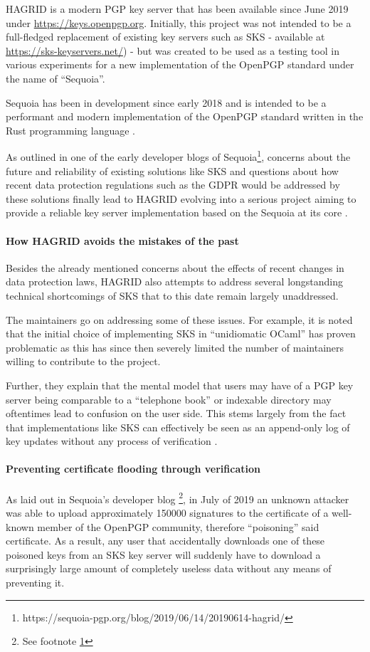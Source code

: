

HAGRID is a modern PGP key server that has been available since June 2019 under \url{https://keys.openpgp.org}. 
Initially, this project was not intended to be a full-fledged replacement of existing key servers such as SKS - available at \url{https://sks-keyservers.net/}) - but was created to be used as a testing tool in various experiments for a new implementation of the OpenPGP standard under the name of ``Sequoia''.

Sequoia has been in development since early 2018 and is intended to be a performant and modern implementation of the OpenPGP standard written in the Rust programming language \cite{sequoia_blog}.

As outlined in one of the early developer blogs of Sequoia\footnote[1]{\label{footnote}https://sequoia-pgp.org/blog/2019/06/14/20190614-hagrid/}, concerns about the future and reliability of existing solutions like SKS and questions about how recent data protection regulations such as the GDPR would be addressed by these solutions finally lead to HAGRID evolving into a serious project aiming to provide a reliable key server implementation based on the Sequoia at its core \cite{sequoia_blog}.


\paragraph{How HAGRID avoids the mistakes of the past}
\label{sec:hagrid_solves}
Besides the already mentioned concerns about the effects of recent changes in data protection laws, HAGRID also attempts to address several longstanding technical shortcomings of SKS that to this date remain largely unaddressed.

The maintainers go on addressing some of these issues. For example, it is noted that the initial choice of implementing SKS in ``unidiomatic OCaml'' has proven problematic as this has since then severely limited the number of maintainers willing to contribute to the project.

Further, they explain that the mental model that users may have of a PGP key server being comparable to a ``telephone book'' or indexable directory may oftentimes lead to confusion on the user side. This stems largely from the fact that implementations like SKS can effectively be seen as an append-only log of key updates without any process of verification \cite{sequoia_blog}.  

\paragraph{Preventing certificate flooding through verification}
As laid out in Sequoia's developer blog \footnote{See footnote \ref{footnote}}, in July of 2019 an unknown attacker was able to upload approximately 150000 signatures to the certificate of a well-known member of the OpenPGP community, therefore ``poisoning'' said certificate. As a result, any user that accidentally downloads one of these poisoned keys from an SKS key server will suddenly have to download a surprisingly large amount of completely useless data without any means of preventing it.

